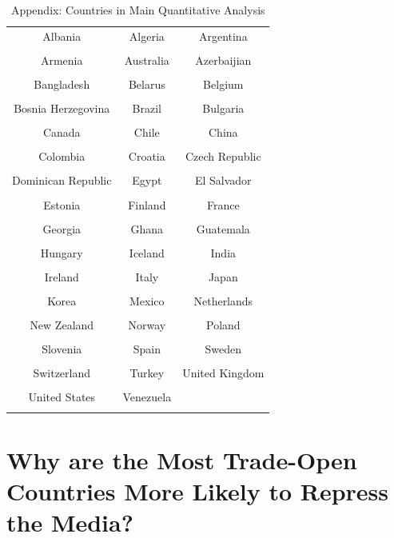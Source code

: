 \documentclass[12pt]{report}
\begin{document}
\begin{table}[htdp]
\caption{Appendix: Countries in Main Quantitative Analysis}
\begin{center}
\vspace{2em}
\begin{tabular}{ccc}
Albania & Algeria & Argentina \\ \\
Armenia & Australia & Azerbaijian \\ \\
Bangladesh & Belarus & Belgium \\ \\
Bosnia Herzegovina & Brazil & Bulgaria \\ \\
Canada & Chile & China \\ \\
Colombia & Croatia & Czech Republic \\ \\
Dominican Republic & Egypt & El Salvador \\ \\
Estonia & Finland & France \\ \\
Georgia & Ghana & Guatemala \\ \\
Hungary & Iceland & India \\ \\
Ireland & Italy & Japan \\ \\
Korea & Mexico & Netherlands \\ \\
New Zealand & Norway & Poland \\ \\
Slovenia & Spain & Sweden \\ \\
Switzerland & Turkey & United Kingdom \\ \\
United States & Venezuela \\ \\

\end{tabular}
\end{center}
\label{default}
\end{table}


\chapter{Why are the Most Trade-Open Countries More Likely to Repress the Media?}
\end{document}
